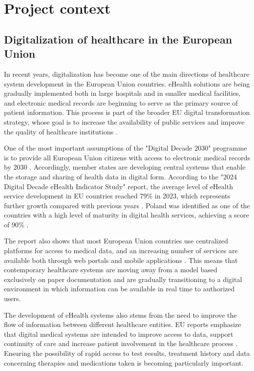 \label{chapter:problem_analysis}

\section{Project context}
\subsection{Digitalization of healthcare in the European Union}
In recent years, digitalization has become one of the main directions of healthcare system development in the European Union countries. eHealth solutions are being gradually implemented both in large hospitals and in smaller medical facilities, and electronic medical records are beginning to serve as the primary source of patient information. This process is part of the broader EU digital transformation strategy, whose goal is to increase the availability of public services and improve the quality of healthcare institutions \cite{EU_eHealth_2024}.

One of the most important assumptions of the "Digital Decade 2030" programme is to provide all European Union citizens with access to electronic medical records by 2030 \cite{EU_eHealth_2024}. Accordingly, member states are developing central systems that enable the storage and sharing of health data in digital form. According to the "2024 Digital Decade eHealth Indicator Study" report, the average level of eHealth service development in EU countries reached 79\% in 2023, which represents further growth compared with previous years \cite{EU_eHealth_2024}. Poland was identified as one of the countries with a high level of maturity in digital health services, achieving a score of 90\% \cite{EU_eHealth_2024}.

The report also shows that most European Union countries use centralized platforms for access to medical data, and an increasing number of services are available both through web portals and mobile applications \cite{EU_eHealth_2024}. This means that contemporary healthcare systems are moving away from a model based exclusively on paper documentation and are gradually transitioning to a digital environment in which information can be available in real time to authorized users.

The development of eHealth systems also stems from the need to improve the flow of information between different healthcare entities. EU reports emphasize that digital medical systems are intended to improve access to data, support continuity of care and increase patient involvement in the healthcare process \cite{EU_eHealth_2024}. Ensuring the possibility of rapid access to test results, treatment history and data concerning therapies and medications taken is becoming particularly important.

